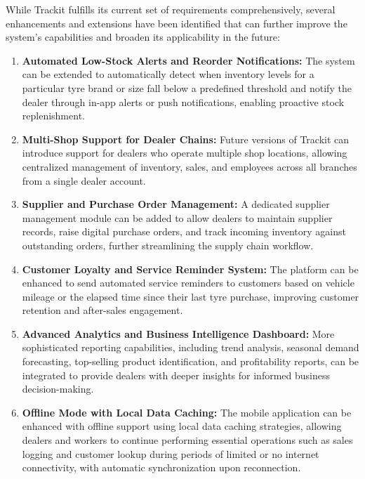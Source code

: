\documentclass[12pt, oneside]{article}
\begin{document}
While Trackit fulfills its current set of requirements comprehensively, several enhancements
and extensions have been identified that can further improve the system's capabilities and
broaden its applicability in the future:

\begin{enumerate}

    \item \textbf{Automated Low-Stock Alerts and Reorder Notifications:} The system can be
    extended to automatically detect when inventory levels for a particular tyre brand or
    size fall below a predefined threshold and notify the dealer through in-app alerts or
    push notifications, enabling proactive stock replenishment.

    \item \textbf{Multi-Shop Support for Dealer Chains:} Future versions of Trackit can
    introduce support for dealers who operate multiple shop locations, allowing centralized
    management of inventory, sales, and employees across all branches from a single dealer
    account.

    \item \textbf{Supplier and Purchase Order Management:} A dedicated supplier management
    module can be added to allow dealers to maintain supplier records, raise digital purchase
    orders, and track incoming inventory against outstanding orders, further streamlining
    the supply chain workflow.

    \item \textbf{Customer Loyalty and Service Reminder System:} The platform can be enhanced
    to send automated service reminders to customers based on vehicle mileage or the elapsed
    time since their last tyre purchase, improving customer retention and after-sales
    engagement.

    \item \textbf{Advanced Analytics and Business Intelligence Dashboard:} More sophisticated
    reporting capabilities, including trend analysis, seasonal demand forecasting, top-selling
    product identification, and profitability reports, can be integrated to provide dealers
    with deeper insights for informed business decision-making.

    \item \textbf{Offline Mode with Local Data Caching:} The mobile application can be
    enhanced with offline support using local data caching strategies, allowing dealers and
    workers to continue performing essential operations such as sales logging and customer
    lookup during periods of limited or no internet connectivity, with automatic
    synchronization upon reconnection.


\end{enumerate}
\end{document}
